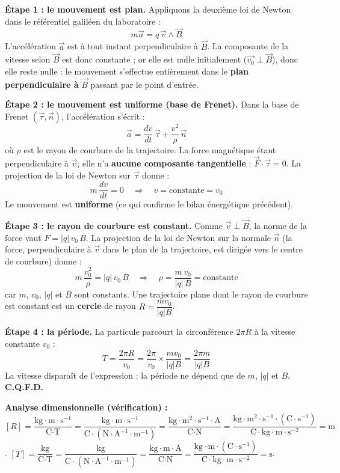 \documentclass[11pt]{article}
\newcommand{\cle}[1]{{\popxbold\color{popdark}#1}}
\begin{document}
\begin{experience}
\textbf{Étape 1 : le mouvement est plan.} Appliquons la deuxième loi de Newton dans le référentiel galiléen du laboratoire :
\[ m\vec{a} = q\,\vec{v} \wedge \vec{B} \]
L'accélération $\vec{a}$ est à tout instant perpendiculaire à $\vec{B}$. La composante de la vitesse selon $\vec{B}$ est donc constante ; or elle est nulle initialement ($\vec{v_0} \perp \vec{B}$), donc elle reste nulle : le mouvement s'effectue entièrement dans le \textbf{plan perpendiculaire à} $\vec{B}$ passant par le point d'entrée.

\textbf{Étape 2 : le mouvement est uniforme (base de Frenet).} Dans la \cle{base de Frenet} $(\vec{\tau}, \vec{n})$, l'accélération s'écrit :
\[ \vec{a} = \dfrac{dv}{dt}\,\vec{\tau} + \dfrac{v^2}{\rho}\,\vec{n} \]
où $\rho$ est le rayon de courbure de la trajectoire. La force magnétique étant perpendiculaire à $\vec{v}$, elle n'a \textbf{aucune composante tangentielle} : $\vec{F}\cdot\vec{\tau} = 0$. La projection de la loi de Newton sur $\vec{\tau}$ donne :
\[ m\,\dfrac{dv}{dt} = 0 \quad\Longrightarrow\quad v = \text{constante} = v_0 \]
Le mouvement est \textbf{uniforme} (ce qui confirme le bilan énergétique précédent).

\textbf{Étape 3 : le rayon de courbure est constant.} Comme $\vec{v} \perp \vec{B}$, la norme de la force vaut $F = |q|\,v_0\,B$. La projection de la loi de Newton sur la normale $\vec{n}$ (la force, perpendiculaire à $\vec{v}$ dans le plan de la trajectoire, est dirigée vers le centre de courbure) donne :
\[ m\,\dfrac{v_0^2}{\rho} = |q|\,v_0\,B \quad\Longrightarrow\quad \rho = \dfrac{m\,v_0}{|q|\,B} = \text{constante} \]
car $m$, $v_0$, $|q|$ et $B$ sont constants. Une trajectoire plane dont le rayon de courbure est constant est un \textbf{cercle} de rayon $R = \dfrac{m v_0}{|q| B}$.

\textbf{Étape 4 : la période.} La particule parcourt la circonférence $2\pi R$ à la vitesse constante $v_0$ :
\[ T = \dfrac{2\pi R}{v_0} = \dfrac{2\pi}{v_0}\times\dfrac{m v_0}{|q| B} = \dfrac{2\pi m}{|q| B} \]
La vitesse disparaît de l'expression : la période ne dépend que de $m$, $|q|$ et $B$. \textbf{C.Q.F.D.}

\textbf{Analyse dimensionnelle (vérification) :}
$[R] = \dfrac{\text{kg}\cdot\text{m}\cdot\text{s}^{-1}}{\text{C}\cdot\text{T}} = \dfrac{\text{kg}\cdot\text{m}\cdot\text{s}^{-1}}{\text{C}\cdot(\text{N}\cdot\text{A}^{-1}\cdot\text{m}^{-1})} = \dfrac{\text{kg}\cdot\text{m}^2\cdot\text{s}^{-1}\cdot\text{A}}{\text{C}\cdot\text{N}} = \dfrac{\text{kg}\cdot\text{m}^2\cdot\text{s}^{-1}\cdot(\text{C}\cdot\text{s}^{-1})}{\text{C}\cdot\text{kg}\cdot\text{m}\cdot\text{s}^{-2}} = \text{m}$.
$[T] = \dfrac{\text{kg}}{\text{C}\cdot\text{T}} = \dfrac{\text{kg}}{\text{C}\cdot(\text{N}\cdot\text{A}^{-1}\cdot\text{m}^{-1})} = \dfrac{\text{kg}\cdot\text{m}\cdot\text{A}}{\text{C}\cdot\text{N}} = \dfrac{\text{kg}\cdot\text{m}\cdot(\text{C}\cdot\text{s}^{-1})}{\text{C}\cdot\text{kg}\cdot\text{m}\cdot\text{s}^{-2}} = \text{s}$.
\end{experience}
\end{document}

